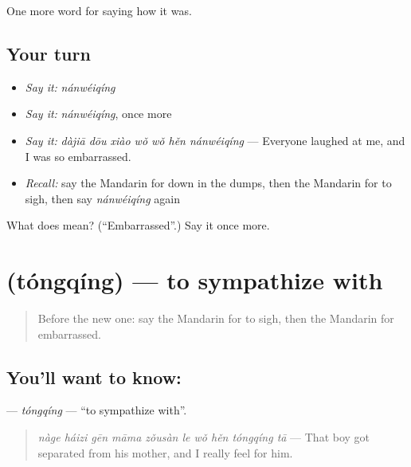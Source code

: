 \begin{grammarlens}[title={What you've built}]
One more word for saying how it was.
\end{grammarlens}

\subsection*{Your turn}
\begin{itemize}
\raggedright
  \item \emph{Say it:} \emph{nánwéiqíng}
  \item \emph{Say it:} \emph{nánwéiqíng}, once more
  \item \emph{Say it:} \emph{dàjiā dōu xiào wǒ wǒ hěn nánwéiqíng} — Everyone laughed at me, and I was so embarrassed.
  \item \emph{Recall:} say the Mandarin for down in the dumps, then the Mandarin for to sigh, then say \emph{nánwéiqíng} again
\end{itemize}

\begin{tcolorbox}[breakable,colback=teal!4,colframe=teal!35!black,title={Before you move on}]
What does  mean? (\textquotedblleft{}Embarrassed\textquotedblright{}.) Say it once more.
\end{tcolorbox}
\section[\texorpdfstring{\zh{同情} (tóngqíng)}{同情 (tóngqíng)}]{ (tóngqíng) — to sympathize with}

\label{lesson:ZH-C460-tongqing}



\begin{quote}
Before the new one: say the Mandarin for to sigh, then the Mandarin for embarrassed.
\end{quote}

\subsection*{You'll want to know: }
\textbf{} — \emph{tóngqíng} — \textquotedblleft{}to sympathize with\textquotedblright{}.

\begin{quote}
\emph{nàge háizi gēn māma zǒusàn le wǒ hěn tóngqíng tā} — That boy got separated from his mother, and I really feel for him.
\end{quote}

